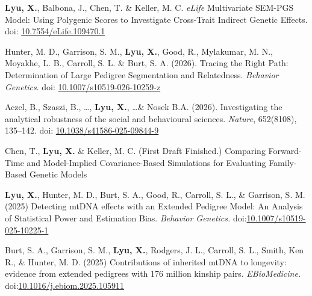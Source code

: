 

\begin{cvpublications}
  \cvpublication
    {\textbf{Lyu, X.}, Balbona, J., Chen, T. \& Keller, M. C. \textit{eLife} Multivariate SEM-PGS Model: Using Polygenic Scores to Investigate Cross-Trait Indirect Genetic Effects. doi: \href{https://doi.org/10.7554/eLife.109470.1}{10.7554/eLife.109470.1}}
    
\cvpublication
    {Hunter, M. D., Garrison, S. M., \textbf{Lyu, X.}, Good, R., Mylakumar, M. N., Moyakhe, L. B., Carroll, S. L. \& Burt, S. A. (2026). Tracing the Right Path: Determination of Large Pedigree Segmentation and Relatedness. \textit{Behavior Genetics}. doi: \href{https://doi.org/10.1007/s10519-026-10259-z}{10.1007/s10519-026-10259-z}}

\cvpublication
    {Aczel, B., Szaszi, B., \dots, \textbf{Lyu, X.}, \dots \& Nosek B.A. (2026). Investigating the analytical robustness of the social and behavioural sciences. \textit{Nature}, 652(8108), 135–142. doi: \href{https://doi.org/10.1038/s41586-025-09844-9}{10.1038/s41586-025-09844-9}}

  \cvpublication
    {Chen, T., \textbf{Lyu, X.} \& Keller, M. C. (First Draft Finished.) Comparing Forward-Time and Model-Implied Covariance-Based Simulations for Evaluating Family-Based Genetic Models} 


  \cvpublication
    {\textbf{Lyu, X.}, Hunter, M. D., Burt, S. A., Good, R., Carroll, S. L., \& Garrison, S. M. (2025) Detecting mtDNA effects with an Extended Pedigree Model: An Analysis of Statistical Power and Estimation Bias. \textit{Behavior Genetics.} doi:\href{https://scholar.google.com/citations?view_op=view_citation&hl=en&user=zxVaBpAAAAAJ&citation_for_view=zxVaBpAAAAAJ:zYLM7Y9cAGgC}{10.1007/s10519-025-10225-1}}

  \cvpublication
    {Burt, S. A., Garrison, S. M., \textbf{Lyu, X.}, Rodgers, J. L., Carroll, S. L., Smith, Ken R., \& Hunter, M. D. (2025) Contributions of inherited mtDNA to longevity: evidence from extended pedigrees with 176 million kinship pairs. \textit{EBioMedicine.}  doi:\href{https://www.thelancet.com/journals/ebiom/article/PIIS2352-3964(25)00355-X/fulltext} {10.1016/j.ebiom.2025.105911}}
    

\end{cvpublications}

